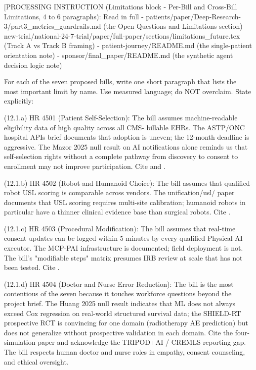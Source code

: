 
[PROCESSING INSTRUCTION (Limitations block - Per-Bill and Cross-Bill
Limitations, 4 to 6 paragraphs): Read in full
- patients/paper/Deep-Research-3/part3\_metrics\_guardrails.md (the
  Open Questions and Limitations section)
- new-trial/national-24-7-trial/paper/full-paper/sections/limitations\_future.tex
  (Track A vs Track B framing)
- patient-journey/README.md (the single-patient orientation note)
- sponsor/final\_paper/README.md (the synthetic agent decision logic
  note)

For each of the seven proposed bills, write one short paragraph that
lists the most important limit by name. Use measured language; do
NOT overclaim. State explicitly:

(12.1.a) HR 4501 (Patient Self-Selection): The bill assumes
machine-readable eligibility data of high quality across all CMS-
billable EHRs. The ASTP/ONC hospital APIs brief documents that
adoption is uneven; the 12-month deadline is aggressive. The Mazor
2025 null result on AI notifications alone reminds us that
self-selection rights without a complete pathway from discovery to
consent to enrollment may not improve participation. Cite
\cite{astp_onc_hospital_apis_2024} and
\cite{mazor2025ai_notifications_trial}.

(12.1.b) HR 4502 (Robot-and-Humanoid Choice): The bill assumes that
qualified-robot USL scoring is comparable across vendors. The
unification/usl/ paper documents that USL scoring requires multi-site
calibration; humanoid robots in particular have a thinner clinical
evidence base than surgical robots. Cite \cite{kawchak_2026_18778219}.

(12.1.c) HR 4503 (Procedural Modification): The bill assumes that
real-time consent updates can be logged within 5 minutes by every
qualified Physical AI executor. The MCP-PAI infrastructure is
documented; field deployment is not. The bill's "modifiable steps"
matrix presumes IRB review at scale that has not been tested. Cite
\cite{kawchak_2026_18973368}.

(12.1.d) HR 4504 (Doctor and Nurse Error Reduction): The bill is the
most contentious of the seven because it touches workforce questions
beyond the project brief. The Huang 2025 null result indicates that
ML does not always exceed Cox regression on real-world structured
survival data; the SHIELD-RT prospective RCT is convincing for one
domain (radiotherapy AE prediction) but does not generalize without
prospective validation in each domain. Cite the four-simulation paper
\cite{kawchak_2026_19994945} and acknowledge the
TRIPOD+AI / CREMLS reporting gap. The bill respects human doctor and
nurse roles in empathy, consent counseling, and ethical oversight.

